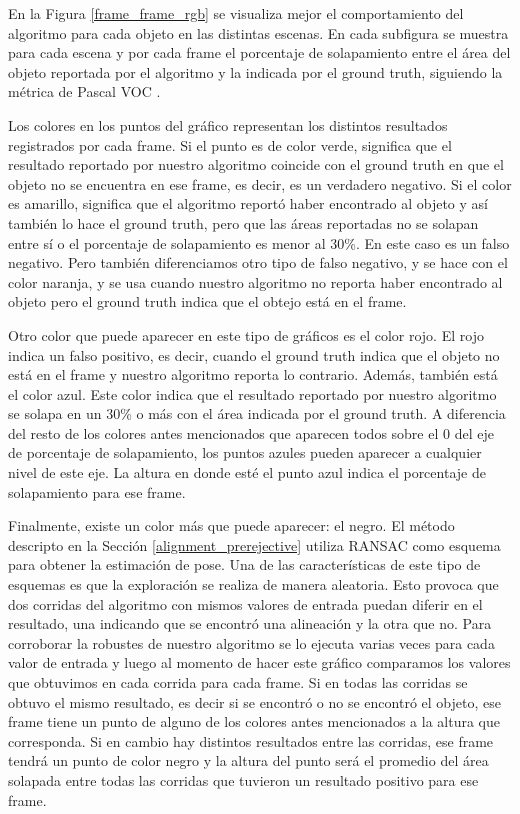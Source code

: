 En la Figura \ref{frame_frame_rgb} se visualiza mejor el comportamiento del algoritmo para cada objeto en las distintas escenas. En cada subfigura se muestra para cada escena y por cada frame el porcentaje de solapamiento entre el área del objeto reportada por el algoritmo y la indicada por el ground truth, siguiendo la métrica de Pascal VOC \cite{everinghampascal}.

Los colores en los puntos del gráfico representan los distintos resultados registrados por cada frame. Si el punto es de color verde, significa que el resultado reportado por nuestro algoritmo coincide con el ground truth en que el objeto no se encuentra en ese frame, es decir, es un verdadero negativo. Si el color es amarillo, significa que el algoritmo reportó haber encontrado al objeto y así también lo hace el ground truth, pero que las áreas reportadas no se solapan entre sí o el porcentaje de solapamiento es menor al 30\%. En este caso es un falso negativo. Pero también diferenciamos otro tipo de falso negativo, y se hace con el color naranja, y se usa cuando nuestro algoritmo no reporta haber encontrado al objeto pero el ground truth indica que el obtejo está en el frame.

Otro color que puede aparecer en este tipo de gráficos es el color rojo. El rojo indica un falso positivo, es decir, cuando el ground truth indica que el objeto no está en el frame y nuestro algoritmo reporta lo contrario. Además, también está el color azul. Este color indica que el resultado reportado por nuestro algoritmo se solapa en un 30\% o más con el área indicada por el ground truth. A diferencia del resto de los colores antes mencionados que aparecen todos sobre el 0 del eje de porcentaje de solapamiento, los puntos azules pueden aparecer a cualquier nivel de este eje. La altura en donde esté el punto azul indica el porcentaje de solapamiento para ese frame.

Finalmente, existe un color más que puede aparecer: el negro. El método descripto en la Sección \ref{alignment_prerejective} utiliza RANSAC como esquema para obtener la estimación de pose. Una de las características de este tipo de esquemas es que la exploración se realiza de manera aleatoria. Esto provoca que dos corridas del algoritmo con mismos valores de entrada puedan diferir en el resultado, una indicando que se encontró una alineación y la otra que no. Para corroborar la robustes de nuestro algoritmo se lo ejecuta varias veces para cada valor de entrada y luego al momento de hacer este gráfico comparamos los valores que obtuvimos en cada corrida para cada frame. Si en todas las corridas se obtuvo el mismo resultado, es decir si se encontró o no se encontró el objeto, ese frame tiene un punto de alguno de los colores antes mencionados a la altura que corresponda. Si en cambio hay distintos resultados entre las corridas, ese frame tendrá un punto de color negro y la altura del punto será el promedio del área solapada entre todas las corridas que tuvieron un resultado positivo para ese frame.



